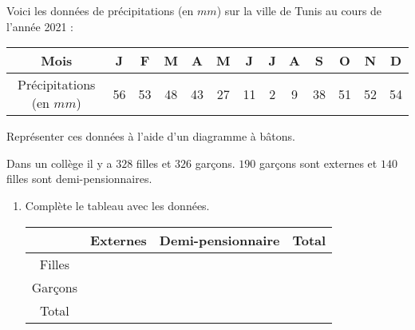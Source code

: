 \begin{pageParcoursd} 


 Voici les données de précipitations (en $mm$) sur la ville de Tunis au cours de l'année 2021 : 
\begin{center}
\begin{tabular}{|c|c|c|c|c|c|c|c|c|c|c|c|c|}\hline
Mois & J & F & M & A & M & J & J & A & S & O & N & D \\\hline
Précipitations (en $mm$) & 56 & 53 & 48 & 43 & 27 & 11 & 2 & 9 & 38 & 51 & 52 & 54 \\\hline
\end{tabular}
 \end{center}

Représenter ces données à l'aide d'un diagramme à bâtons.
 
\begin{center}
\end{center}
 
 
 
 
Dans un collège il y a $328$ filles et $326$ garçons. $190$ garçons sont externes et $140$ filles sont demi-pensionnaires.

\begin{enumerate}[leftmargin=*]
 \item Complète le tableau avec les données.
 \begin{center}
 \begin{tabular}{|c|c|c|c|} \hline
    & Externes & Demi-pensionnaire &  Total \\  \hline
  Filles &    &   & \\\hline
  Garçons &  &   &  \\\hline
  Total & &  & \\ \hline
 \end{tabular}
 \end{center}
 

\end{enumerate}
\end{pageParcoursd}
